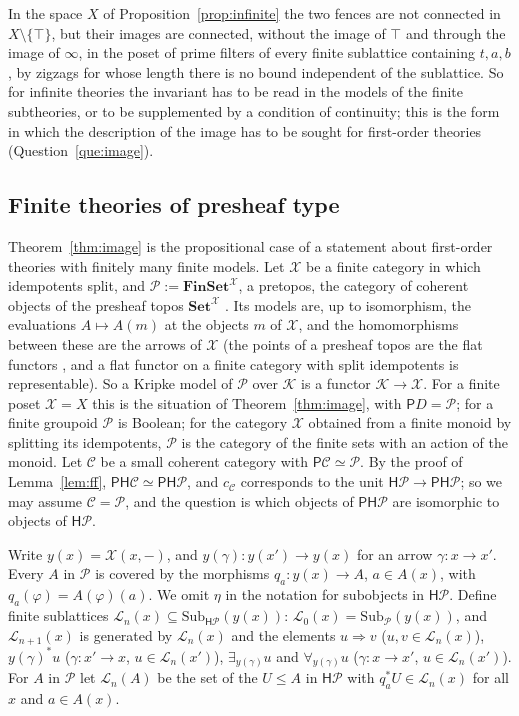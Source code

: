 \documentclass[11pt]{amsart}
\theoremstyle{definition}
\newcommand{\Set}{\mathbf{Set}}
\newcommand{\Sub}{\mathrm{Sub}}
\newcommand{\PP}{\mathsf P}
\newcommand{\HH}{\mathsf H}
\newcommand{\cC}{\mathcal C}
\newcommand{\cK}{\mathcal K}
\begin{document}
In the space $X$ of Proposition~\ref{prop:infinite} the two fences
are not connected in $X\setminus\{\top\}$, but their images are
connected, without the image of $\top$ and through the image of
$\infty$, in the poset of prime filters of every finite sublattice
containing $t,a,b$, by zigzags for whose length there is no bound independent of the
sublattice. So for infinite theories the invariant has to be read in the
models of the finite subtheories, or to be supplemented by a condition
of continuity; this is the form in which the description of the image
has to be sought for first-order theories (Question~\ref{que:image}).

\subsection*{Finite theories of presheaf type}
Theorem~\ref{thm:image} is the propositional case of a statement about
first-order theories with finitely many finite models. Let $\mathcal X$
be a finite category in which idempotents split, and $\mathcal P:=
\mathbf{FinSet}^{\mathcal X}$, a pretopos, the category of coherent
objects of the presheaf topos $\Set^{\mathcal X}$
\cite[D3.3]{Elephant}. Its models are, up to isomorphism, the evaluations $A\mapsto A(m)$
at the objects $m$ of $\mathcal X$, and the homomorphisms between
these are the arrows of $\mathcal X$ (the points of a presheaf topos are the flat
functors \cite[B3.2]{Elephant}, and a flat functor on a finite category
with split idempotents is representable). So a Kripke model of
$\mathcal P$ over $\cK$ is a functor $\cK\to\mathcal X$. For a finite
poset $\mathcal X=X$ this is the situation of Theorem~\ref{thm:image},
with $\PP D=\mathcal P$; for a finite groupoid $\mathcal P$ is Boolean;
for the category $\mathcal X$ obtained from a finite monoid by
splitting its idempotents, $\mathcal P$ is the category of the finite
sets with an action of the monoid. Let $\cC$ be a small coherent category
with $\PP\cC\simeq\mathcal P$. By the proof of Lemma~\ref{lem:ff},
$\PP\HH\cC\simeq\PP\HH\mathcal P$, and $c_\cC$ corresponds to the unit
$\HH\mathcal P\to\PP\HH\mathcal P$; so we may assume $\cC=\mathcal P$,
and the question is which objects of $\PP\HH\mathcal P$ are isomorphic
to objects of $\HH\mathcal P$.

Write $y(x)=\mathcal X(x,-)$, and $y(\gamma)\colon y(x')\to y(x)$ for
an arrow $\gamma\colon x\to x'$. Every $A$ in $\mathcal P$ is covered
by the morphisms $q_a\colon y(x)\to A$, $a\in A(x)$, with
$q_a(\varphi)=A(\varphi)(a)$. We omit $\eta$ in the notation for
subobjects in $\HH\mathcal P$. Define finite sublattices
$\mathcal L_n(x)\subseteq\Sub_{\HH\mathcal P}(y(x))$: $\mathcal L_0(x)=
\Sub_{\mathcal P}(y(x))$, and $\mathcal L_{n+1}(x)$ is generated by
$\mathcal L_n(x)$ and the elements $u\Rightarrow v$ ($u,v\in
\mathcal L_n(x)$), $y(\gamma)^*u$ ($\gamma\colon x'\to x$, $u\in
\mathcal L_n(x')$), $\exists_{y(\gamma)}u$ and $\forall_{y(\gamma)}u$
($\gamma\colon x\to x'$, $u\in\mathcal L_n(x')$). For $A$ in
$\mathcal P$ let $\mathcal L_n(A)$ be the set of the $U\le A$ in
$\HH\mathcal P$ with $q_a^*U\in\mathcal L_n(x)$ for all $x$ and
$a\in A(x)$.
\end{document}
